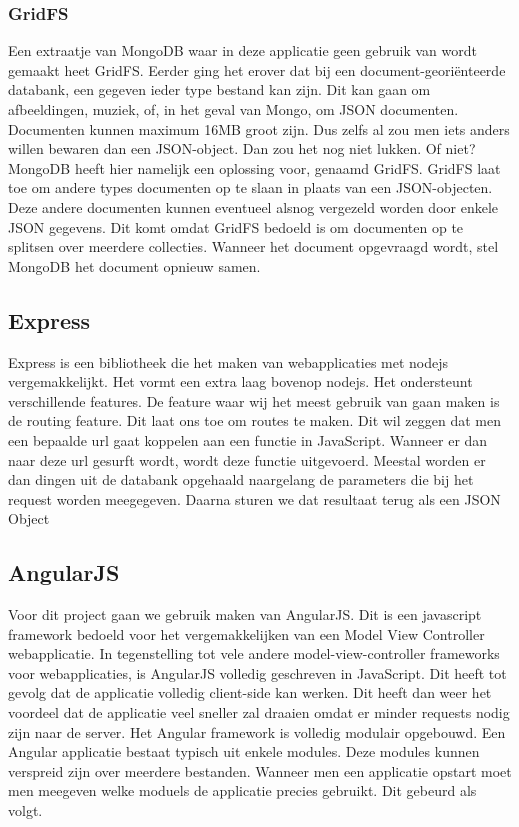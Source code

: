 \documentclass[a4paper,11pt]{article}
\begin{document}
\subsubsection{GridFS}
Een extraatje van MongoDB waar in deze applicatie geen gebruik van wordt gemaakt heet GridFS. Eerder ging het erover dat bij een document-georiënteerde databank, een gegeven ieder type bestand kan zijn. Dit kan gaan om afbeeldingen, muziek, of, in het geval van Mongo, om JSON documenten. Documenten kunnen maximum 16MB groot zijn. Dus zelfs al zou men iets anders willen bewaren dan een JSON-object. Dan zou het nog niet lukken. Of niet? MongoDB heeft hier namelijk een oplossing voor, genaamd GridFS. GridFS laat toe om andere types documenten op te slaan in plaats van een JSON-objecten. Deze andere documenten kunnen eventueel alsnog vergezeld worden door enkele JSON gegevens. Dit komt omdat GridFS bedoeld is om documenten op te splitsen over meerdere collecties. Wanneer het document opgevraagd wordt, stel MongoDB het document opnieuw samen.

\subsection{Express}
Express is een bibliotheek die het maken van webapplicaties met nodejs vergemakkelijkt. Het vormt een extra laag bovenop nodejs. Het ondersteunt verschillende features. De feature waar wij het meest gebruik van gaan maken is de routing feature. Dit laat ons toe om routes te maken. Dit wil zeggen dat men een bepaalde url gaat koppelen aan een functie in JavaScript. Wanneer er dan naar deze url gesurft wordt, wordt deze functie uitgevoerd. Meestal worden er dan dingen uit de databank opgehaald naargelang de parameters die bij het request worden meegegeven. Daarna sturen we dat resultaat terug als een JSON Object

\subsection{AngularJS}

Voor dit project gaan we gebruik maken van AngularJS. Dit is een javascript framework bedoeld voor het vergemakkelijken van een Model View Controller webapplicatie. In tegenstelling tot vele andere model-view-controller frameworks voor webapplicaties, is AngularJS volledig geschreven in JavaScript. Dit heeft tot gevolg dat de applicatie volledig client-side kan werken. Dit heeft dan weer het voordeel dat de applicatie veel sneller zal draaien omdat er minder requests nodig zijn naar de server. Het Angular framework is volledig modulair opgebouwd. Een Angular applicatie bestaat typisch uit enkele modules. Deze modules kunnen verspreid zijn over meerdere bestanden. Wanneer men een applicatie opstart moet men meegeven welke moduels de applicatie precies gebruikt. Dit gebeurd als volgt.
\end{document}

